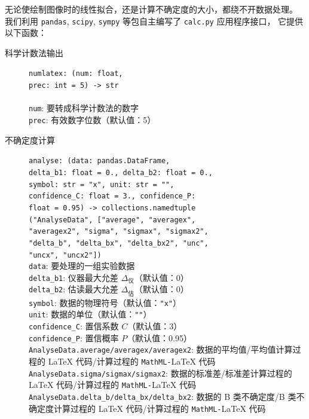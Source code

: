 无论使绘制图像时的线性拟合，还是计算不确定度的大小，都绕不开数据处理。
我们利用 \verb|pandas|, \verb|scipy|, \verb|sympy| 等包自主编写了 \verb|calc.py| 应用程序接口，
它提供以下函数：
\begin{description}
  \item[科学计数法输出] \verb|numlatex: (num: float,|\\\verb|prec: int = 5) -> str|\\
  \\
  \verb|num|: 要转成科学计数法的数字\\
  \verb|prec|: 有效数字位数（默认值：5）
  \item[不确定度计算] \verb|analyse: (data: pandas.DataFrame,|\\\verb|delta_b1: float = 0., delta_b2: float = 0.,|\\\verb|symbol: str = "x", unit: str = "",|\\\verb|confidence_C: float = 3., confidence_P:|\\\verb|float = 0.95) -> collections.namedtuple|\\\verb|("AnalyseData", ["average", "averagex",|\\\verb|"averagex2", "sigma", "sigmax", "sigmax2",|\\\verb|"delta_b", "delta_bx", "delta_bx2", "unc",|\\\verb|"uncx", "uncx2"])|\\
  \verb|data|: 要处理的一组实验数据\\
  \verb|delta_b1|: 仪器最大允差 \(\Delta_\text{仪}\)（默认值：0）\\
  \verb|delta_b2|: 估读最大允差 \(\Delta_\text{估}\)（默认值：0）\\
  \verb|symbol|: 数据的物理符号（默认值：\verb|"x"|）\\
  \verb|unit|: 数据的单位（默认值：\verb|""|）\\
  \verb|confidence_C|: 置信系数 \(C\)（默认值：3）\\
  \verb|confidence_P|: 置信概率 \(P\)（默认值：0.95）\\
  \verb|AnalyseData.average/averagex/averagex2|: 数据的平均值/平均值计算过程的 \LaTeX{} 代码/计算过程的 \verb|MathML-|\LaTeX{} 代码\\
  \verb|AnalyseData.sigma/sigmax/sigmax2|: 数据的标准差/标准差计算过程的 \LaTeX{} 代码/计算过程的 \verb|MathML-|\LaTeX{} 代码\\
  \verb|AnalyseData.delta_b/delta_bx/delta_bx2|: 数据的 B 类不确定度/B 类不确定度计算过程的 \LaTeX{} 代码/计算过程的 \verb|MathML-|\LaTeX{} 代码\\

\end{description}
